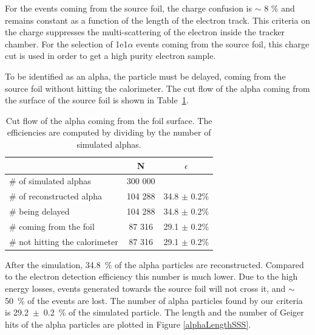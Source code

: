 \documentclass[main.tex]{subfiles}
\begin{document}
\bigskip


\noindent For the events coming from the source foil, the charge confusion is $\sim$ 8 $\%$ and remains constant as a function of the length of the electron track. This criteria on the charge suppresses the multi-scattering of the electron inside the tracker chamber. For the selection of 1e1$\alpha$ events coming from the source foil, this charge cut is used in order to get a high purity electron sample.


\FloatBarrier


\noindent To be identified as an alpha, the particle must be delayed, coming from the source foil without hitting the calorimeter. The cut flow of the alpha coming from the surface of the source foil is shown in Table~\ref{Cutflowelectronalpha}.


\begin{table}[h!]
\begin{center}
\begin{tabular}{l|c|c}
 & N & $\epsilon$ \\
\hline
$\#$ of simulated alphas & 300 000 & \\
\hline
$\#$ of reconstructed alpha & 104 288 & 34.8 $\pm$ 0.2\%\\
$\#$ being delayed          & 104 288 & 34.8 $\pm$ 0.2\%\\
$\#$ coming from the foil   & 87 316  & 29.1 $\pm$ 0.2\%\\
$\#$ not hitting the calorimeter & 87 316  & 29.1 $\pm$ 0.2\%\\
\end{tabular}
\end{center}
\caption{Cut flow of the alpha coming from the foil surface. The efficiencies are computed by dividing by the number of simulated alphas.}
\label{Cutflowelectronalpha}
\end{table}


\bigskip


\noindent After the simulation, 34.8~\% of the alpha particles are reconstructed. Compared to the electron detection efficiency this number is much lower. Due to the high energy losses, events generated towards the source foil will not cross it, and $\sim$50~\% of the events are lost. The number of alpha particles found by our criteria is 29.2~$\pm$~0.2~\% of the simulated particle. The length and the number of Geiger hits of the alpha particles are plotted in Figure \ref{alphaLengthSSS}.


\bigskip
\end{document}

